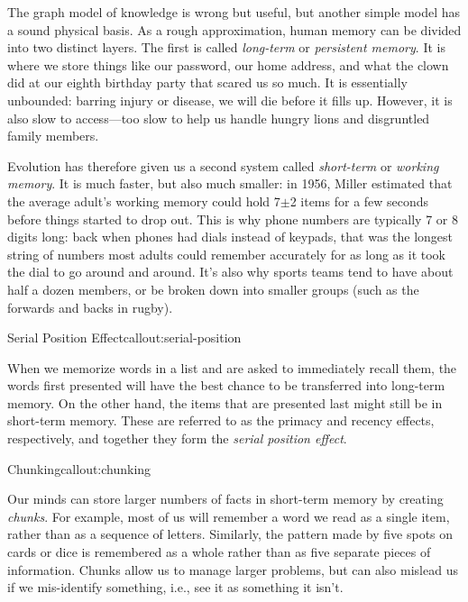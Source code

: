 
The graph model of knowledge is wrong but useful, but another simple
model has a sound physical basis.  As a rough approximation, human
memory can be divided into two distinct layers. The first is
called \emph{long-term} or \emph{persistent memory}. It is where we
store things like our password, our home address, and what the clown
did at our eighth birthday party that scared us so much. It is
essentially unbounded: barring injury or disease, we will die before
it fills up.  However, it is also slow to access---too slow to help us
handle hungry lions and disgruntled family members.

Evolution has therefore given us a second system
called \emph{short-term} or \emph{working memory}. It is much faster,
but also much smaller: in 1956, Miller estimated that the average
adult's working memory could hold 7$\pm$2 items for a few seconds
before things started to drop out. This is why phone numbers are
typically 7 or 8 digits long: back when phones had dials instead of
keypads, that was the longest string of numbers most adults could
remember accurately for as long as it took the dial to go around and
around. It's also why sports teams tend to have about half a dozen
members, or be broken down into smaller groups (such as the forwards
and backs in rugby).

\begin{callout}{Serial Position Effect}{callout:serial-position}

When we memorize words in a list and are asked to immediately recall
them, the words first presented will have the best chance to be
transferred into long-term memory. On the other hand, the items that
are presented last might still be in short-term memory. These are
referred to as the primacy and recency effects, respectively, and
together they form the \emph{serial position effect}.

\end{callout}

\begin{callout}{Chunking}{callout:chunking}

Our minds can store larger numbers of facts in short-term memory by
creating \emph{chunks}. For example, most of us will remember a word
we read as a single item, rather than as a sequence of letters.
Similarly, the pattern made by five spots on cards or dice is
remembered as a whole rather than as five separate pieces of
information.  Chunks allow us to manage larger problems, but can also
mislead us if we mis-identify something, i.e., see it as something it
isn't.

\end{callout}

